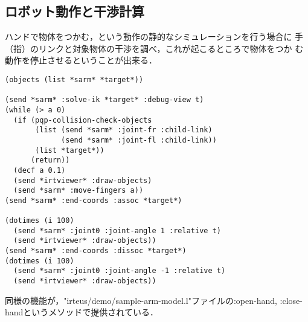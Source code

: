 \subsection{ロボット動作と干渉計算}

ハンドで物体をつかむ，という動作の静的なシミュレーションを行う場合に
手（指）のリンクと対象物体の干渉を調べ，これが起こるところで物体をつか
む動作を停止させるということが出来る．

{\baselineskip=10pt
\begin{verbatim}
(objects (list *sarm* *target*))

(send *sarm* :solve-ik *target* :debug-view t)
(while (> a 0)
  (if (pqp-collision-check-objects
       (list (send *sarm* :joint-fr :child-link)
             (send *sarm* :joint-fl :child-link))
       (list *target*))
      (return))
  (decf a 0.1)
  (send *irtviewer* :draw-objects)
  (send *sarm* :move-fingers a))
(send *sarm* :end-coords :assoc *target*)

(dotimes (i 100)
  (send *sarm* :joint0 :joint-angle 1 :relative t)
  (send *irtviewer* :draw-objects))
(send *sarm* :end-coords :dissoc *target*)
(dotimes (i 100)
  (send *sarm* :joint0 :joint-angle -1 :relative t)
  (send *irtviewer* :draw-objects))
\end{verbatim}
}

同様の機能が，"irteus/demo/sample-arm-model.l"ファイルの:open-hand,
:close-handというメソッドで提供されている．

 
